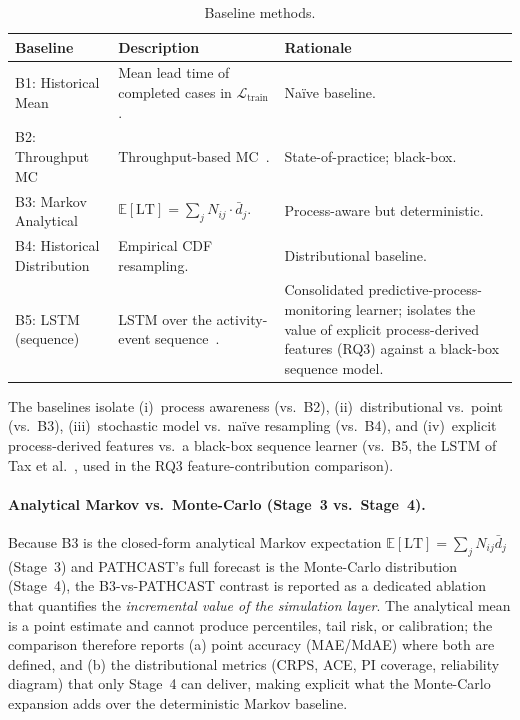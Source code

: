 \begin{table}[htbp]
\centering
\caption{Baseline methods.}
\label{tab:baselines}
\small
\begin{tabular}{lp{4cm}p{5cm}}
\toprule
\textbf{Baseline} & \textbf{Description} & \textbf{Rationale} \\
\midrule
B1: Historical Mean         & Mean lead time of completed cases in $\mathcal{L}_{\text{train}}$. & Naïve baseline. \\
\midrule
B2: Throughput MC           & Throughput-based MC~\cite{vacanti2015,savage2009flaw,magennis2011forecasting}. & State-of-practice; black-box. \\
\midrule
B3: Markov Analytical       & $\mathbb{E}[\text{LT}] = \sum_j N_{ij} \cdot \bar{d}_j$. & Process-aware but deterministic. \\
\midrule
B4: Historical Distribution & Empirical CDF resampling. & Distributional baseline. \\
\midrule
B5: LSTM (sequence) & LSTM over the activity-event sequence~\cite{tax2017}. & Consolidated predictive-process-monitoring learner; isolates the value of explicit process-derived features (RQ3) against a black-box sequence model. \\
\bottomrule
\end{tabular}
\end{table}

The baselines isolate (i)~process awareness (vs.\ B2),
(ii)~distributional vs.\ point (vs.\ B3), (iii)~stochastic model vs.\
naïve resampling (vs.\ B4), and (iv)~explicit process-derived features vs.\
a black-box sequence learner (vs.\ B5, the LSTM of Tax et
al.~\cite{tax2017}, used in the RQ3 feature-contribution comparison).

\paragraph{Analytical Markov vs.\ Monte-Carlo (Stage~3 vs.\ Stage~4).}
Because B3 is the closed-form analytical Markov expectation
$\mathbb{E}[\text{LT}] = \sum_j N_{ij}\bar{d}_j$ (Stage~3) and PATHCAST's
full forecast is the Monte-Carlo distribution (Stage~4), the B3-vs-PATHCAST
contrast is reported as a dedicated ablation that quantifies the
\emph{incremental value of the simulation layer}. The analytical mean is a
point estimate and cannot produce percentiles, tail risk, or calibration;
the comparison therefore reports (a) point accuracy (MAE/MdAE) where both are
defined, and (b) the distributional metrics (CRPS, ACE, PI coverage,
reliability diagram) that only Stage~4 can deliver, making explicit what the
Monte-Carlo expansion adds over the deterministic Markov baseline.


